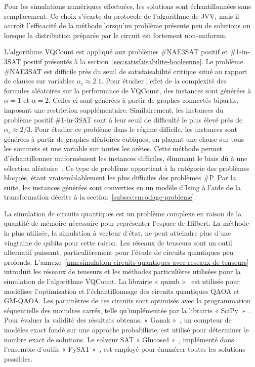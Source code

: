 Pour les simulations numériques effectuées, les solutions sont échantillonnées sans remplacement. Ce choix s'écarte du protocole de l'algorithme de JVV, mais il accroît l'efficacité de la méthode lorsqu'un problème présente peu de solutions ou lorsque la distribution préparée par le circuit est fortement non-uniforme.

L'algorithme VQCount est appliqué aux problèmes \#NAE3SAT positif et \#1-in-3SAT positif présentés à la section~\ref{sec:satisfaisabilite-booleenne}. Le problème \#NAE3SAT est difficile près du seuil de satisfaisabilité critique situé au rapport de clauses sur variables $\alpha_{c} \approx 2.1$. Pour étudier l'effet de la complexité des formules aléatoires sur la performance de VQCount, des instances sont générées à $\alpha = 1$ et $\alpha = 2$. Celles-ci sont générées à partir de graphes connectés bipartis, imposant une restriction supplémentaire. Similairement, les instances du problème positif \#1-in-3SAT sont à leur seuil de difficulté le plus élevé près de $\alpha_{c} \approx 2/3$. Pour étudier ce problème dans le régime difficile, les instances sont générées à partir de graphes aléatoires cubiques, en plaçant une clause sur tous les sommets et une variable sur toutes les arêtes. Cette méthode permet d'échantillonner uniformément les instances difficiles, éliminant le biais dû à une sélection aléatoire~\cite{vigerEfficientSimpleGeneration2005}. Ce type de problème appartient à la catégorie des problèmes bloqués, étant vraisemblablement les plus difficiles des problèmes \textsf{\#P}. Par la suite, les instances générées sont converties en un modèle d'Ising à l'aide de la transformation décrite à la section~\ref{subsec:encodage-probleme}.

La simulation de circuits quantiques est un problème complexe en raison de la quantité de mémoire nécessaire pour représenter l'espace de Hilbert. La méthode la plus utilisée, la simulation à vecteur d'état, ne peut atteindre plus d'une vingtaine de qubits pour cette raison. Les réseaux de tenseurs sont un outil alternatif puissant, particulièrement pour l'étude de circuits quantiques peu profonds. L'annexe~\ref{ann:simulation-circuits-quantiques-avec-reseaux-de-tenseurs} introduit les réseaux de tenseurs et les méthodes particulières utilisées pour la simulation de l'algorithme VQCount. La librairie « quimb »~\cite{grayQuimbPythonPackage2018} est utilisée pour modéliser l'optimisation et l'échantillonnage des circuits quantiques QAOA et GM-QAOA. Les paramètres de ces circuits sont optimisés avec la programmation séquentielle des moindres carrés, telle qu'implémentée par la librairie « SciPy »~\cite{virtanenSciPy10Fundamental2020}. Pour évaluer la validité des résultats obtenus, « Ganak »~\cite{sharmaGANAKScalableProbabilistic2019}, un compteur de modèles exact fondé sur une approche probabiliste, est utilisé pour déterminer le nombre exact de solutions. Le solveur SAT « Glucose4 »~\cite{eenExtensibleSATsolver2004,audemardPredictingLearntClauses2009}, implémenté dans l'ensemble d'outils « PySAT »~\cite{ignatievPySATPythonToolkit2018}, est employé pour énumérer toutes les solutions possibles.

